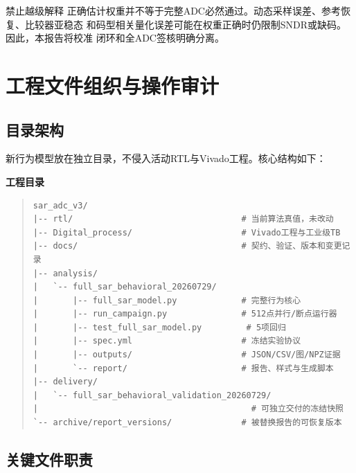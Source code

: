 \documentclass[11pt,a4paper,UTF8,fontset=none,openany]{ctexrep}
\numberwithin{equation}{chapter}
\numberwithin{figure}{chapter}
\numberwithin{table}{chapter}
\begin{document}
\begin{riskbox}{禁止越级解释}
正确估计权重并不等于完整ADC必然通过。动态采样误差、参考恢复、比较器亚稳态
和码型相关量化误差可能在权重正确时仍限制SNDR或缺码。因此，本报告将校准
闭环和全ADC签核明确分离。
\end{riskbox}

\chapter{工程文件组织与操作审计}

\section{目录架构}

新行为模型放在独立目录，不侵入活动RTL与Vivado工程。核心结构如下：

\noindent\textbf{工程目录}
\begin{quote}
\begin{Verbatim}[fontsize=\small,breaklines=true]
sar_adc_v3/
|-- rtl/                                  # 当前算法真值，未改动
|-- Digital_process/                      # Vivado工程与工业级TB
|-- docs/                                 # 契约、验证、版本和变更记录
|-- analysis/
|   `-- full_sar_behavioral_20260729/
|       |-- full_sar_model.py             # 完整行为核心
|       |-- run_campaign.py               # 512点并行/断点运行器
|       |-- test_full_sar_model.py         # 5项回归
|       |-- spec.yml                      # 冻结实验协议
|       |-- outputs/                      # JSON/CSV/图/NPZ证据
|       `-- report/                       # 报告、样式与生成脚本
|-- delivery/
|   `-- full_sar_behavioral_validation_20260729/
|                                           # 可独立交付的冻结快照
`-- archive/report_versions/              # 被替换报告的可恢复版本
\end{Verbatim}
\end{quote}

\section{关键文件职责}
\end{document}
